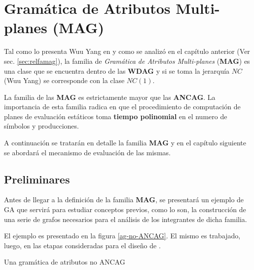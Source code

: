 \chapter{Gramática de Atributos Multi-planes (MAG)}
\label{chap:mag}
\minitoc

Tal como lo presenta Wuu Yang en \cite{wuu-yang1} y como se analizó en el capítulo anterior (Ver sec. \ref{sec:relfamag}), la familia de \textit{Gramática de Atributos Multi-planes} (\textbf{MAG}) es una clase que se encuentra dentro de las \textbf{WDAG} y si se toma la jerarquía $NC$ (Wuu Yang) se corresponde con la clase $NC(1)$.

La familia de las \textbf{MAG} es estrictamente mayor que las \textbf{ANCAG}. La importancia de esta familia radica en que el procedimiento de computación de planes de evaluación estáticos toma \textbf{tiempo polinomial} en el numero de símbolos y producciones.

A continuación se tratarán en detalle la familia \textbf{MAG} y en el capítulo siguiente se abordará el mecanismo de evaluación de las mismas.

\section{Preliminares}
\label{sec:pre-grafos}

Antes de llegar a la definición de la familia \textbf{MAG}, se presentará un ejemplo de GA que servirá para estudiar conceptos previos, como lo son, la construcción de una serie de grafos necesarios para el análisis de los integrantes de dicha familia.

El ejemplo es presentado en la figura \ref{ag-no-ANCAG}. El mismo es trabajado, luego, en las etapas consideradas para el diseño de \maggen.

\begin{AG}
    \begin{Attribution}
    \end{Attribution}
    \begin{Attribution}
    \end{Attribution}
    \begin{Attribution}
    \end{Attribution}
    \begin{Attribution}
    \end{Attribution}
    \begin{Attribution}
    \end{Attribution}
\label{ag-no-ANCAG}
\caption{Una gramática de atributos no ANCAG}
\end{AG}

